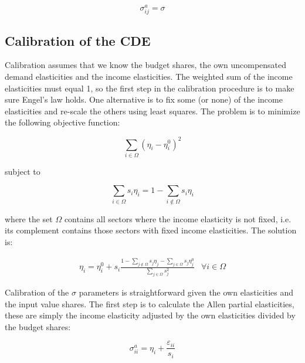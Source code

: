 \begin{equation}
\sigma_{ij}^a = {\sigma}
\end{equation}

\subsection{Calibration of the CDE}

Calibration assumes that we know the budget shares, the own uncompensated demand elasticities and
the income elasticities. The weighted sum of the income elasticities must equal 1, so the first
step in the calibration procedure is to make sure Engel's law holds. One alternative is to fix
some (or none) of the income elasticities and re-scale the others using least squares. The problem
is to minimize the following objective function:

\begin{displaymath}
{\sum\limits_{i \in \Omega } {\left( {{\eta_i} - \eta_i^0} \right)}^2}
\end{displaymath}

\noindent subject to

\begin{displaymath}
\sum\limits_{i \in \Omega } {{s_i}{\eta_i}}  = 1 - \sum\limits_{i \notin \Omega } {{s_i}{\eta_i}}
\end{displaymath}

\noindent where the set $\Omega$ contains all sectors where the income elasticity is not fixed,
i.e. its complement contains those sectors with fixed income elasticities. The solution is:

\begin{displaymath}
\begin{array}{*{20}{c}}
\eta_i = \eta_i^0 + s_i
\frac{\displaystyle {1 - \sum\limits_{j \notin \Omega } {s_j \eta_j}
- \displaystyle \sum\limits_{j \in \Omega } {s_j \eta_j^0} }}
{{\displaystyle \sum\limits_{j \in \Omega } {s_j^2} }}&{\forall i \in \Omega }
\end{array}
\end{displaymath}

Calibration of the $\sigma$ parameters is straightforward given the own elasticities and the input
value shares. The first step is to calculate the Allen partial elasticities, these are simply the
income elasticity adjusted by the own elasticities divided by the budget shares:

\begin{equation}
\label{eq:APEOWN}
\sigma_{ii}^a = {\eta_i} + \frac{{{\varepsilon_{ii}}}}{{{s_i}}}
\end{equation}

